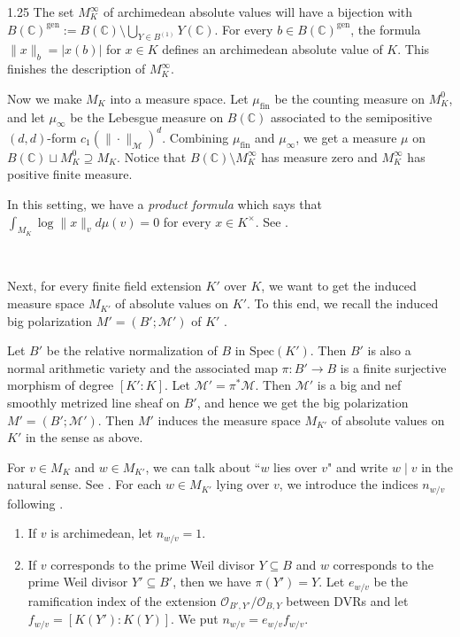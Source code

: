 \documentclass[12pt]{article}
\begin{document}
\begin{spacing}{1.25}
The set $M_{K}^{\infty}$ of archimedean absolute values will have a bijection with $B(\mathbb{C})^{\mathrm{gen}}:=B(\mathbb{C})\setminus\bigcup\limits_{Y\in B^{(1)}}Y(\mathbb{C})$. For every $b\in B(\mathbb{C})^{\mathrm{gen}}$, the formula $\|x\|_b=|x(b)|$ for $x\in K$ defines an archimedean absolute value of $K$. This finishes the description of $M_K^{\infty}$.

Now we make $M_K$ into a measure space. Let $\mu_{\mathrm{fin}}$ be the counting measure on $M_K^0$, and let $\mu_{\infty}$ be the Lebesgue measure on $B(\mathbb{C})$ associated to the semipositive $(d,d)$-form $c_1(\|\cdot\|_{\mathcal{M}})^d$. Combining $\mu_{\mathrm{fin}}$ and $\mu_{\infty}$, we get a measure $\mu$ on $B(\mathbb{C})\sqcup M_K^0\supseteq M_K$. Notice that $B(\mathbb{C})\setminus M_{K}^{\infty}$ has measure zero and $M_K^{\infty}$ has positive finite measure.

In this setting, we have a \emph{product formula} which says that $\int_{M_K}\log\|x\|_vd\mu(v)=0$ for every $x\in K^{\times}$. See \cite[Section 3.2]{Mor00}.

~

Next, for every finite field extension $K'$ over $K$, we want to get the induced measure space $M_{K'}$ of absolute values on $K'$. To this end, we recall the induced big polarization $M'=(B';\mathcal{M}')$ of $K'$ \cite[Definition 3.9]{Voj21}.

Let $B'$ be the relative normalization of $B$ in $\mathrm{Spec}(K')$. Then $B'$ is also a normal arithmetic variety and the associated map $\pi\colon B'\to B$ is a finite surjective morphism of degree $[K':K]$. Let $\mathcal{M}'=\pi^*\mathcal{M}$. Then $\mathcal{M}'$ is a big and nef smoothly metrized line sheaf on $B'$, and hence we get the big polarization $M'=(B';\mathcal{M}')$. Then $M'$ induces the measure space $M_{K'}$ of absolute values on $K'$ in the sense as above.

For $v\in M_{K}$ and $w\in M_{K'}$, we can talk about ``$w$ lies over $v$" and write $w\mid v$ in the natural sense. See \cite[Definition 3.10]{Voj21}. For each $w\in M_{K'}$ lying over $v$, we introduce the indices $n_{w/v}$ following \cite[Proposition 3.11]{Voj21}.
\begin{enumerate}
\item
If $v$ is archimedean, let $n_{w/v}=1$.
\item
If $v$ corresponds to the prime Weil divisor $Y\subseteq B$ and $w$ corresponds to the prime Weil divisor $Y'\subseteq B'$, then we have $\pi(Y')=Y$. Let $e_{w/v}$ be the ramification index of the extension $\mathcal{O}_{B',Y'}/\mathcal{O}_{B,Y}$ between DVRs and let $f_{w/v}=[K(Y'):K(Y)]$. We put $n_{w/v}=e_{w/v}f_{w/v}$.
\end{enumerate}


\end{spacing}
\end{document}
